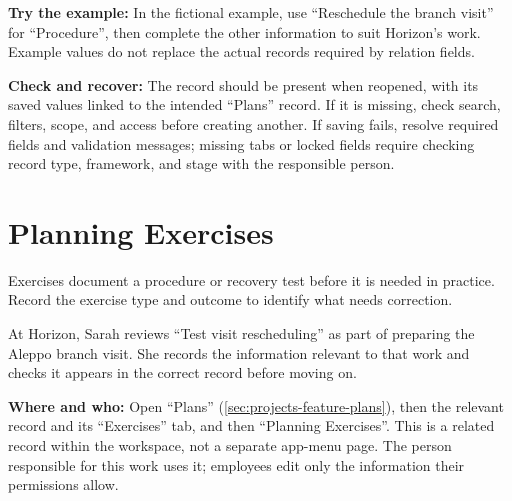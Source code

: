\textbf{Try the example:} In the fictional example, use “Reschedule the branch visit” for “Procedure”, then complete the other information to suit Horizon's work. Example values do not replace the actual records required by relation fields.

\textbf{Check and recover:} The record should be present when reopened, with its saved values linked to the intended “Plans” record. If it is missing, check search, filters, scope, and access before creating another. If saving fails, resolve required fields and validation messages; missing tabs or locked fields require checking record type, framework, and stage with the responsible person.

\clearpage
\section{Planning Exercises}
\label{sec:projects-feature-planning-exercises}

Exercises document a procedure or recovery test before it is needed in practice. Record the exercise type and outcome to identify what needs correction.

\begin{rcnote}
At Horizon, Sarah reviews “Test visit rescheduling” as part of preparing the Aleppo branch visit. She records the information relevant to that work and checks it appears in the correct record before moving on.
\end{rcnote}

\textbf{Where and who:} Open “Plans” (\ref{sec:projects-feature-plans}), then the relevant record and its “Exercises” tab, and then “Planning Exercises”. This is a related record within the workspace, not a separate app-menu page. The person responsible for this work uses it; employees edit only the information their permissions allow.

